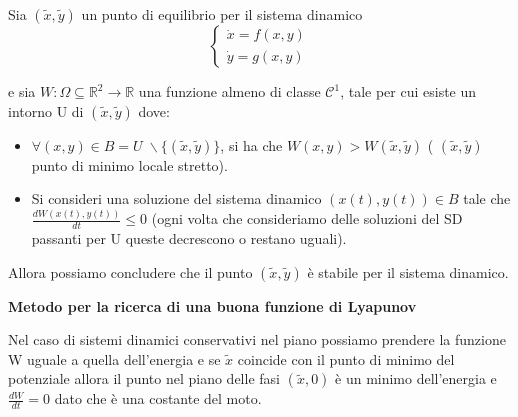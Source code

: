 \begin{theorem}
Sia $(\tilde{x},\tilde{y})$ un punto di equilibrio per il sistema dinamico 
	\begin{equation*}
		\left \{ \begin{array}{l}
			\dot{x} = f(x,y)\\
			\dot{y} = g(x,y)
		\end{array} \right.
	\end{equation*}	
\end{theorem}
e sia $W: \Omega \subseteq 	\mathbb{R}^2 \rightarrow \mathbb{R}$ una funzione almeno di classe $\mathcal{C}^1$, tale per cui esiste un intorno U di $(\tilde{x},\tilde{y})$ dove:
\begin{itemize}
	\item $\forall (x,y) \in B =U \;\backslash \{(\tilde{x},\tilde{y})\} $, si ha che $W(x,y) > W(\tilde{x},\tilde{y})$ ( $(\tilde{x},\tilde{y})$ punto di minimo locale stretto).
	\item Si consideri una soluzione del sistema dinamico $(x(t),y(t)) \in B$ tale che $\frac{dW(x(t),y(t))}{dt} \leq 0$ (ogni volta che consideriamo delle soluzioni del SD passanti per U queste decrescono o restano uguali).
\end{itemize}
Allora possiamo concludere che il punto $(\tilde{x},\tilde{y})$ \`{e} stabile per il sistema dinamico. \newline

\noindent \textbf{Metodo per la ricerca di una buona funzione di Lyapunov}
\newline

\noindent Nel caso di sistemi dinamici conservativi nel piano possiamo prendere la funzione W uguale a quella dell'energia e se $\tilde{x}$ coincide con il punto di minimo del potenziale allora il punto nel piano delle fasi $(\tilde{x},0)$ \`{e} un minimo dell'energia e $\frac{dW}{dt} = 0$ dato che \`{e} una costante del moto.

\newpage

